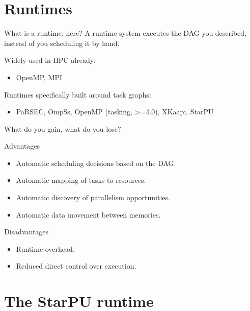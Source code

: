 \documentclass[presentation, aspectratio=169]{beamer}
\begin{document}
\section{Runtimes}
\label{sec:orgb26447d}

\begin{frame}[label={sec:orgcfd9e27}]{What is a runtime, here?}
A \alert{runtime system} executes the DAG you described, instead of you
scheduling it by hand.

Widely used in HPC already:
\begin{itemize}
\item OpenMP, MPI
\end{itemize}

Runtimes specifically built around task graphs:
\begin{itemize}
\item PaRSEC, OmpSs, OpenMP (tasking, >=4.0), XKaapi, \alert{StarPU}
\end{itemize}
\end{frame}
\begin{frame}[label={sec:org696aca5}]{What do you gain, what do you lose?}
\begin{block}{Advantages}
\begin{itemize}
\item Automatic scheduling decisions based on the DAG.
\item Automatic mapping of tasks to resources.
\item Automatic discovery of parallelism opportunities.
\item Automatic data movement between memories.
\end{itemize}
\end{block}
\begin{block}{Disadvantages}
\begin{itemize}
\item Runtime \alert{overhead}.
\item Reduced direct control over execution.
\end{itemize}
\end{block}
\end{frame}
\section{The StarPU runtime}
\label{sec:org32ecbff}
\end{document}

